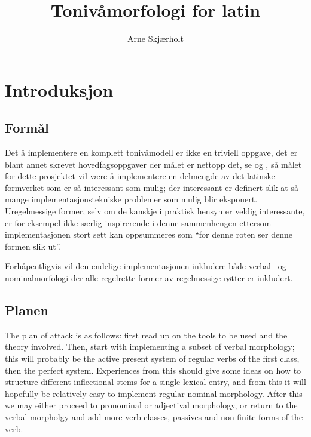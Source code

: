 \documentclass{article}
\title{Toniv\aa{}morfologi for latin}
\author{Arne Skj\ae{}rholt}
\begin{document}
\maketitle
\tableofcontents

\section{Introduksjon}
\subsection{Form\aa{}l}
Det \aa{} implementere en komplett toniv\aa{}modell er ikke en triviell
oppgave, det er blant annet skrevet hovedfagsoppgaver der m\aa{}let er nettopp
det, se \cite{bondihoved} og \cite{french}, s\aa{} m\aa{}let for dette
prosjektet vil v\ae{}re \aa{} implementere en delmengde av det latinske
formverket som er s\aa{} interessant som mulig; der interessant er definert
slik at s\aa{} mange implementasjonstekniske problemer som mulig blir
eksponert. Uregelmessige former, selv om de kanskje i praktisk hensyn er
veldig interessante, er for eksempel ikke s\ae{}rlig inspirerende i denne
sammenhengen ettersom implementasjonen stort sett kan oppsummeres som ``for
denne roten ser denne formen slik ut''.

Forh\aa{}pentligvis vil den endelige implementasjonen inkludere b\aa{}de
verbal-- og nominalmorfologi der alle regelrette former av regelmessige
r\o{}tter er inkludert.

\subsection{Planen}
The plan of attack is as follows: first read up on the tools to be used and
the theory involved. Then, start with implementing a subset of verbal
morphology; this will probably be the active present system of regular verbs
of the first class, then the perfect system. Experiences from this should give
some ideas on how to structure different inflectional stems for a single
lexical entry, and from this it will hopefully be relatively easy to implement
regular nominal morphology. After this we may either proceed to pronominal or
adjectival morphology, or return to the verbal morpholgy and add more verb
classes, passives and non-finite forms of the verb.

\end{document}
